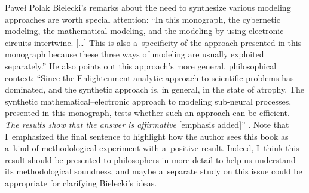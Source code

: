 \begin{newrevengenv}{Paweł Polak}
Bielecki's remarks about the need to synthesize various modeling approaches are worth special attention: ``In this monograph, the cybernetic modeling, the mathematical modeling, and the modeling by using electronic circuits intertwine. […] This is also a~specificity of the approach presented in this monograph because these three ways of modeling are usually exploited separately.'' He also points out this approach's more general, philosophical context: ``Since the Enlightenment analytic approach to scientific problems has dominated, and the synthetic approach is, in general, in the state of atrophy. The synthetic mathematical–electronic approach to modeling sub-neural processes, presented in this monograph, tests whether such an approach can be efficient. \textit{The results show that the answer is affirmative} [emphasis added]''
\parencite[][p.124]{bielecki_models_2019}. %
 Note that I~emphasized the final sentence to highlight how the author sees this book as a~kind of methodological experiment with a~positive result. Indeed, I~think this result should be presented to philosophers in more detail to help us understand its methodological soundness, and maybe a~separate study on this issue could be appropriate for clarifying Bielecki's ideas.


\end{newrevengenv}
